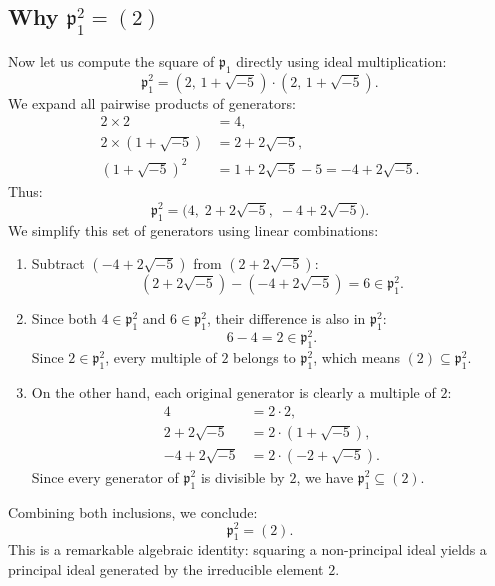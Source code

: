 \documentclass[a4paper]{article}
\begin{document}
\subsection{Why \texorpdfstring{$\mathfrak{p}_1^2 = (2)$}{p1\textasciicircum 2 = (2)}}
\label{subsec:p1_squared}
Now let us compute the square of $\mathfrak{p}_1$ directly using ideal multiplication:
\begin{equation}
 \mathfrak{p}_1^2 = (2, \, 1 + \sqrt{-5}) \cdot (2, \, 1 + \sqrt{-5}).
\end{equation}
We expand all pairwise products of generators:
\begin{align}
 2 \times 2 &= 4, \\
 2 \times (1 + \sqrt{-5}) &= 2 + 2\sqrt{-5}, \\
 (1 + \sqrt{-5})^2 &= 1 + 2\sqrt{-5} - 5 = -4 + 2\sqrt{-5}.
\end{align}
Thus:
\begin{equation}
 \mathfrak{p}_1^2 = \Big(4, \; 2 + 2\sqrt{-5}, \; -4 + 2\sqrt{-5}\Big).
\end{equation}
We simplify this set of generators using linear combinations:
\begin{enumerate}
 \item Subtract $(-4 + 2\sqrt{-5})$ from $(2 + 2\sqrt{-5})$:
 \begin{equation}
  (2 + 2\sqrt{-5}) - (-4 + 2\sqrt{-5}) = 6 \in \mathfrak{p}_1^2.
 \end{equation}
 \item Since both $4 \in \mathfrak{p}_1^2$ and $6 \in \mathfrak{p}_1^2$, their difference is also in $\mathfrak{p}_1^2$:
 \begin{equation}
  6 - 4 = 2 \in \mathfrak{p}_1^2.
 \end{equation}
 Since $2 \in \mathfrak{p}_1^2$, every multiple of $2$ belongs to $\mathfrak{p}_1^2$, which means $(2) \subseteq \mathfrak{p}_1^2$.
 \item On the other hand, each original generator is clearly a multiple of $2$:
 \begin{align}
  4 &= 2 \cdot 2, \\
  2 + 2\sqrt{-5} &= 2 \cdot (1 + \sqrt{-5}), \\
  -4 + 2\sqrt{-5} &= 2 \cdot (-2 + \sqrt{-5}).
 \end{align}
 Since every generator of $\mathfrak{p}_1^2$ is divisible by $2$, we have $\mathfrak{p}_1^2 \subseteq (2)$.
\end{enumerate}
Combining both inclusions, we conclude:
\begin{equation}
 \boxed{\mathfrak{p}_1^2 = (2)}.
\end{equation}
This is a remarkable algebraic identity: squaring a non-principal ideal yields a principal ideal generated by the irreducible element $2$.
\end{document}
